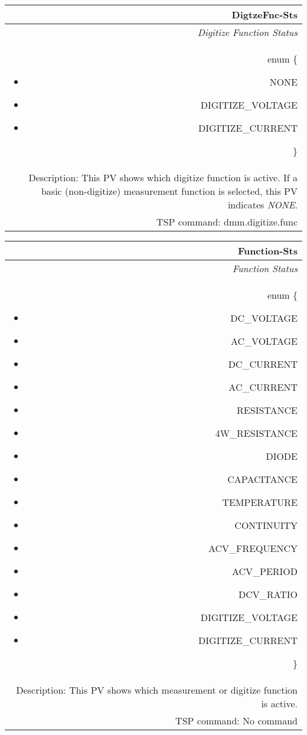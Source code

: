 \documentclass[openany]{article}
\begin{document}
		\begin{tabular}{N}
			\hline
			\bfseries DigtzeFnc-Sts\label{pv:digtzefnc-sts} \\ \hline
			\emph{Digitize Function Status} \\
			enum \{\begin{itemize}[noitemsep]
				\small
				\item[] NONE
				\item[] DIGITIZE\_VOLTAGE
				\item[] DIGITIZE\_CURRENT
			\end{itemize}\} \\
			Description: This PV shows which digitize function is active. If a basic (non-digitize) measurement function is selected, this PV indicates \emph{NONE}. \\
			TSP command: dmm.digitize.func
		\end{tabular}

		\begin{tabular}{N}
			\hline
			\bfseries Function-Sts\label{pv:function-sts} \\ \hline
			\emph{Function Status} \\
			enum \{\begin{itemize}[noitemsep]
				\item[] DC\_VOLTAGE
				\item[] AC\_VOLTAGE
				\item[] DC\_CURRENT
				\item[] AC\_CURRENT
				\item[] RESISTANCE
				\item[] 4W\_RESISTANCE
				\item[] DIODE
				\item[] CAPACITANCE
				\item[] TEMPERATURE
				\item[] CONTINUITY
				\item[] ACV\_FREQUENCY
				\item[] ACV\_PERIOD
				\item[] DCV\_RATIO
				\item[] DIGITIZE\_VOLTAGE
				\item[] DIGITIZE\_CURRENT
			\end{itemize}\} \\
			Description: This PV shows which measurement or digitize function is active. \\
			TSP command: No command
		\end{tabular}
\end{document}
